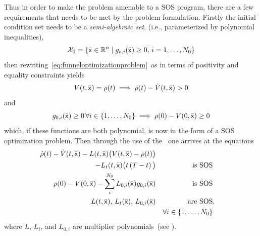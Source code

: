Thus in order to make the problem amenable to a \ac{SOS} program, there are a
few requirements that needs to be met by the problem formulation. Firstly the
initial condition set needs to be a \textit{semi-algebraic set}, (i.e.,
parameterized by polynomial inequalities),
%
\begin{equation}
  \mathcal{X}_0 = \lbrace\bar{{\mathbf{\mathsf{x}}}} \in \mathbb{R}^n \mid g_{o,i}(\bar{{\mathbf{\mathsf{x}}}}) \geq 0, \, i = 1,\ldots,N_0\rbrace
\end{equation}
%
then rewriting~\cref{eq:funneloptimizationproblem}~as in terms of positivity and
equality constraints yields
\begin{equation}
  V(t,\bar{{\mathbf{\mathsf{x}}}}) = \rho(t) \implies \dot{\rho}(t) - \dot{V}(t,\bar{{\mathbf{\mathsf{x}}}}) > 0
\end{equation}
and
\begin{equation}
  g_{0,i}(\bar{{\mathbf{\mathsf{x}}}}) \geq 0 \, \forall i \in \lbrace1,\ldots,N_0\rbrace \implies \rho(0) - V(0,\bar{{\mathbf{\mathsf{x}}}}) \geq 0
\end{equation}
which, if these functions are both polynomial, is now in the form of a \ac{SOS}
optimization problem. Then through the use of the~ one
arrives at the equations
\begin{subequations}
\begin{align}
  \dot{\rho}(t) - \dot{V}(t,\bar{{\mathbf{\mathsf{x}}}}) - L(t,\bar{{\mathbf{\mathsf{x}}}}) \big( V(t,\bar{{\mathbf{\mathsf{x}}}}) - \rho(t) \big)& \nonumber \\
                                            - L_{t}(t,\bar{{\mathbf{\mathsf{x}}}})\big( t\left( T - t \right) \big)&   \label{eq:sufficient-conditions}
  &\text{is SOS}&  \\
  \rho(0) - V(0,\bar{{\mathbf{\mathsf{x}}}}) - \sum_{i}^{N_{0}} L_{0,i}(\bar{{\mathbf{\mathsf{x}}}})g_{0,i}(\bar{{\mathbf{\mathsf{x}}}})&  &\text{is SOS}&  \\
  L(t, \bar{{\mathbf{\mathsf{x}}}}), \, L_{t}(\bar{{\mathbf{\mathsf{x}}}}), \, L_{0,i}(\bar{{\mathbf{\mathsf{x}}}})& &\text{are SOS}&, \nonumber \\
  &&\forall i \in \lbrace1,\ldots,N_{0}\rbrace& \nonumber
\end{align} 
\end{subequations}
where \(L\), \(L_{t}\), and \(L_{0,i}\) are multiplier polynomials~(see
).

